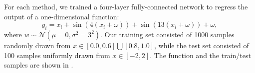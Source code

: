 For each method, we trained a four-layer fully-connected network to regress the output of a one-dimensional function: 
\begin{equation}
y_i = x_i + \sin{\left(4( x_i + \omega)\right)} + \sin{\left(13(x_i + \omega)\right)} + \omega,
\end{equation}
where $w \sim \mathcal{N}(\mu=0, \sigma^2=3^2)$. Our training set consisted of 1000 samples randomly drawn from $x \in \left[0.0,0.6\right]\bigcup \left[0.8,1.0\right]$, while the test set consisted of 100 samples uniformly drawn from $x \in \left[ -2, 2\right]$. The function and the train/test samples are shown in . 





